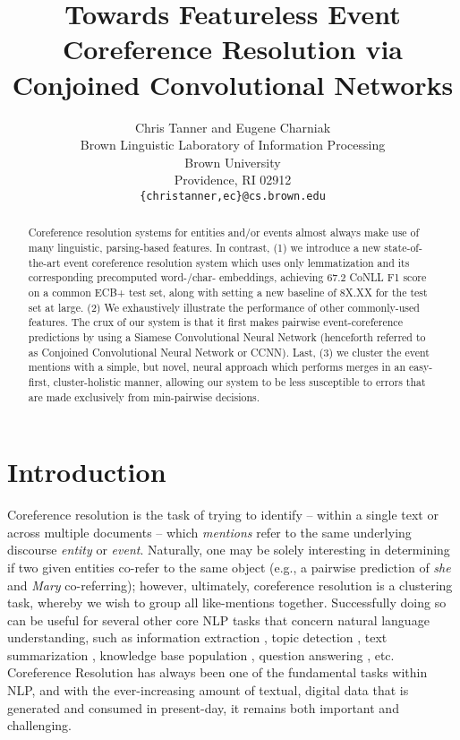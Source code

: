 \documentclass[11pt,a4paper]{article}
\title{Towards Featureless Event Coreference Resolution via Conjoined Convolutional Networks}
\author{Chris Tanner \textnormal{and} Eugene Charniak\\
Brown Linguistic Laboratory of Information Processing \\
  Brown University \\
  Providence, RI  02912 \\
  {\tt \{christanner,ec\}@cs.brown.edu} \\}
\date{}
\begin{document}
\maketitle
\begin{abstract}
Coreference resolution systems for entities and/or events almost always make use of many linguistic, parsing-based features.  In contrast, (1) we introduce a new state-of-the-art event coreference resolution system which uses only lemmatization and its corresponding precomputed word-/char- embeddings, achieving 67.2 CoNLL F1 score on a common ECB+ test set, along with setting a new baseline of 8X.XX for the test set at large. (2) We exhaustively illustrate the performance of other commonly-used features.  The crux of our system is that it first makes pairwise event-coreference predictions by using a Siamese Convolutional Neural Network (henceforth referred to as Conjoined Convolutional Neural Network or CCNN).  Last, (3) we cluster the event mentions with a simple, but novel, neural approach which performs merges in an easy-first, cluster-holistic manner, allowing our system to be less susceptible to errors that are made exclusively from min-pairwise decisions.
\end{abstract}

\section{Introduction}
Coreference resolution is the task of trying to identify -- within a single text or across multiple documents -- which \textit{mentions} refer to the same underlying discourse \textit{entity} or \textit{event}.  Naturally, one may be solely interesting in determining if two given entities co-refer to the same object (e.g., a pairwise prediction of \textit{she} and \textit{Mary} co-referring); however, ultimately, coreference resolution is a clustering task, whereby we wish to group all like-mentions together.  Successfully doing so can be useful for several other core NLP tasks that concern natural language understanding, such as information extraction \cite{Humphreys:1997}, topic detection \cite{Allan:1998}, text summarization \cite{Daniel:2003}, knowledge base population \cite{Cross_Document_Coreference_Resolution_A_Key_Technology_for_Learning_by_Reading}, question answering \cite{Narayanan:2004:QAB:1220355.1220455}, etc.
Coreference Resolution has always been one of the fundamental tasks within NLP, and with the ever-increasing amount of textual, digital data that is generated and consumed in present-day, it remains both important and challenging.
\end{document}
